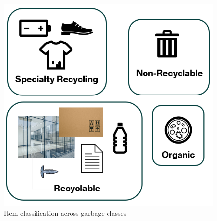 \documentclass[11pt,twocolumn]{article}
\begin{document}
\begin{figure}[h]
    \centering
    \includegraphics[width=0.8\linewidth]{report_images/dataset_classes.png}
    \caption{Item classification across garbage classes}
    \label{fig:dataset}
\end{figure}
\end{document}
